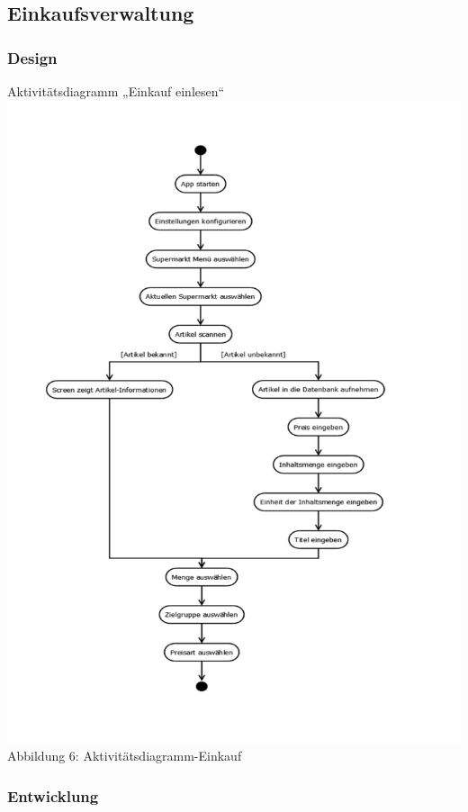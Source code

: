 \documentclass[12pt,a4paper]{article}
\begin{document}
\subsection{Einkaufsverwaltung}
\subsubsection{Design}
Aktivitätsdiagramm „Einkauf einlesen“ 
\\
\hspace*{-10mm} 
\includegraphics[trim = 17mm 0mm 0mm 20mm,clip, scale=0.7]{Aktiv-Einkauf.pdf}
\\
\footnotesize Abbildung 6: Aktivitätsdiagramm-Einkauf
\normalsize
\subsubsection*{Entwicklung}
\newpage
\end{document}

